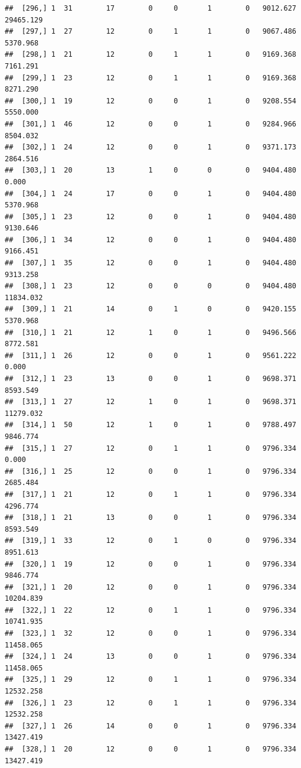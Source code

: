 \documentclass[
]{article}
\begin{document}
\begin{verbatim}
##  [296,] 1  31        17        0     0       1        0   9012.627  29465.129
##  [297,] 1  27        12        0     1       1        0   9067.486   5370.968
##  [298,] 1  21        12        0     1       1        0   9169.368   7161.291
##  [299,] 1  23        12        0     1       1        0   9169.368   8271.290
##  [300,] 1  19        12        0     0       1        0   9208.554   5550.000
##  [301,] 1  46        12        0     0       1        0   9284.966   8504.032
##  [302,] 1  24        12        0     0       1        0   9371.173   2864.516
##  [303,] 1  20        13        1     0       0        0   9404.480      0.000
##  [304,] 1  24        17        0     0       1        0   9404.480   5370.968
##  [305,] 1  23        12        0     0       1        0   9404.480   9130.646
##  [306,] 1  34        12        0     0       1        0   9404.480   9166.451
##  [307,] 1  35        12        0     0       1        0   9404.480   9313.258
##  [308,] 1  23        12        0     0       0        0   9404.480  11834.032
##  [309,] 1  21        14        0     1       0        0   9420.155   5370.968
##  [310,] 1  21        12        1     0       1        0   9496.566   8772.581
##  [311,] 1  26        12        0     0       1        0   9561.222      0.000
##  [312,] 1  23        13        0     0       1        0   9698.371   8593.549
##  [313,] 1  27        12        1     0       1        0   9698.371  11279.032
##  [314,] 1  50        12        1     0       1        0   9788.497   9846.774
##  [315,] 1  27        12        0     1       1        0   9796.334      0.000
##  [316,] 1  25        12        0     0       1        0   9796.334   2685.484
##  [317,] 1  21        12        0     1       1        0   9796.334   4296.774
##  [318,] 1  21        13        0     0       1        0   9796.334   8593.549
##  [319,] 1  33        12        0     1       0        0   9796.334   8951.613
##  [320,] 1  19        12        0     0       1        0   9796.334   9846.774
##  [321,] 1  20        12        0     0       1        0   9796.334  10204.839
##  [322,] 1  22        12        0     1       1        0   9796.334  10741.935
##  [323,] 1  32        12        0     0       1        0   9796.334  11458.065
##  [324,] 1  24        13        0     0       1        0   9796.334  11458.065
##  [325,] 1  29        12        0     1       1        0   9796.334  12532.258
##  [326,] 1  23        12        0     1       1        0   9796.334  12532.258
##  [327,] 1  26        14        0     0       1        0   9796.334  13427.419
##  [328,] 1  20        12        0     0       1        0   9796.334  13427.419

\end{verbatim}
\end{document}
